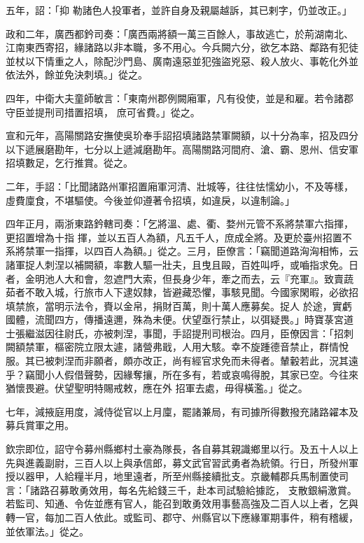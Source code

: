 \begin{pinyinscope}
 五年，詔：「抑
 勒諸色人投軍者，並許自身及親屬越訴，其已剌字，仍並改正。」



 政和二年，廣西都鈐司奏：「廣西兩將額一萬三百餘人，事故逃亡，於荊湖南北、江南東西寄招，緣諸路以非本職，多不用心。今兵闕六分，欲乞本路、鄰路有犯徒並杖以下情重之人，除配沙門島、廣南遠惡並犯強盜兇惡、殺人放火、事乾化外並依法外，餘並免決刺填。」從之。



 四年，中衛大夫童師敏言：「東南州郡例闕廂軍，凡有役使，並是和雇。若令諸郡守臣並提刑司措置招填，
 庶可省費。」從之。



 宣和元年，高陽關路安撫使吳玠奉手詔招填諸路禁軍闕額，以十分為率，招及四分以下遞展磨勘年，七分以上遞減磨勘年。高陽關路河間府、滄、霸、恩州、信安軍招填數足，乞行推賞。從之。



 二年，手詔：「比聞諸路州軍招置廂軍河清、壯城等，往往怯懦幼小，不及等樣，虛費廩食，不堪驅使。今後並仰遵著令招填，如違戾，以違制論。」



 四年正月，兩浙東路鈐轄司奏：「乞將溫、處、衢、婺州元管不系將禁軍六指揮，更招置增為十指
 揮，並以五百人為額，凡五千人，庶成全將。及更於臺州招置不系將禁軍一指揮，以四百人為額。」從之。三月，臣僚言：「竊聞道路洶洶相怖，云諸軍捉人刺涅以補闕額，率數人驅一壯夫，且曳且毆，百姓叫呼，或嚙指求免。日者，金明池人大和會，忽遮門大索，但長身少年，牽之而去，云『充軍』。致賣蔬茹者不敢入城，行旅市人下逮奴隸，皆避藏恐懼，事駭見聞。今國家閑暇，必欲招填禁旅，當明示法令，賚以金帛，捐財百萬，則十萬人應募矣。捉人
 於途，實虧國體，流聞四方，傳播遠邇，殊為未便。伏望亟行禁止，以弭疑畏。」時寶菉宮道士張繼滋因往尉氏，亦被刺涅，事聞，手詔提刑司根治。四月，臣僚因言：「招刺闕額禁軍，樞密院立限太遽，諸營弗戢，人用大駭。幸不旋踵德音禁止，群情悅服。其已被刺涅而非願者，頗亦改正，尚有經官求免而未得者。輦轂若此，況其遠乎？竊聞小人假借聲勢，因緣奪攘，所在多有，若或哀鳴得脫，其家已空。今往來猶懷畏避。伏望聖明特賜戒敕，應在外
 招軍去處，毋得橫濫。」從之。



 七年，減掖庭用度，減侍從官以上月廩，罷諸兼局，有司據所得數撥充諸路糴本及募兵賞軍之用。



 欽宗即位，詔守令募州縣鄉村土豪為隊長，各自募其親識鄉里以行。及五十人以上先與進義副尉，三百人以上與承信郎，募文武官習武勇者為統領。行日，所發州軍授以器甲，人給糧半月，地里遠者，所至州縣接續批支。京畿輔郡兵馬制置使司言：「諸路召募敢勇效用，每名先給錢三千，赴本司試驗給據訖，
 支散銀絹激賞。若監司、知通、令佐並應有官人，能召到敢勇效用事藝高強及二百人以上者，乞與轉一官，每加二百人依此。或監司、郡守、州縣官以下應緣軍期事件，稍有稽緩，並依軍法。」從之。




\end{pinyinscope}
